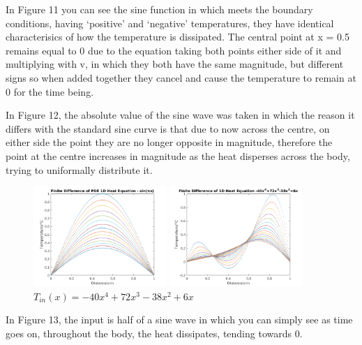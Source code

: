 \documentclass[11pt,a4paper]{article}
\begin{document}
\vspace{3mm}In Figure 11 you can see the sine function in which meets the boundary conditions, having `positive' and `negative' temperatures, they have identical characterisics of how the temperature is dissipated. The central point at x = 0.5 remains equal to 0 due to the equation taking both points either side of it and multiplying with v, in which they both have the same magnitude, but different signs so when added together they cancel and cause the temperature to remain at 0 for the time being.

\vspace{3mm}In Figure 12, the absolute value of the sine wave was taken in which the reason it differs with the standard sine curve is that due to now across the centre, on either side the point they are no longer opposite in magnitude, therefore the point at the centre increases in magnitude as the heat disperses across the body, trying to uniformally distribute it.

\pagebreak

\begin{figure}
	\includegraphics[width=0.45\textwidth]{Ex4_Figs/sinpi.png}
	\vspace{-3mm}
	\caption{$T_{in}(x)= sin(\pi x)$}
	\label{fig:test1}
		\includegraphics[width=0.45\textwidth]{Ex4_Figs/poly.png}
		\vspace{-3mm}
	\caption{$T_{in}(x)= -40x^4 +72x^3 -38x^2 +6x$}
	\label{fig:test2}
\end{figure}

In Figure 13, the input is half of a sine wave in which you can simply see as time goes on, throughout the body, the heat dissipates, tending towards 0.
\end{document}
